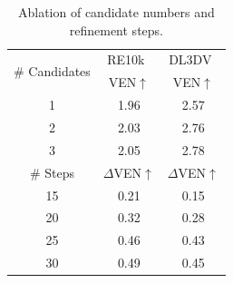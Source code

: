 \begin{table}[t]
\small
  \centering
  \begin{tabular}{c | c | c}
    \toprule
    \multirow{2}{*}{\# Candidates} & RE10k~\cite{re10k} & DL3DV~\cite{dl3dv} \\
    & VEN$\uparrow$ & VEN$\uparrow$  \\
    \midrule
    1 & 1.96 & 2.57  \\
    2 &  2.03 & 2.76  \\
    3 &  2.05 & 2.78  \\
    \midrule
     \# Steps & $\Delta$VEN$\uparrow$ & $\Delta$VEN$\uparrow$ \\
    \midrule
    15 & 0.21 & 0.15 \\
    20 & 0.32 & 0.28 \\
    25 & 0.46 & 0.43 \\
    30 & 0.49 & 0.45 \\
    \bottomrule
  \end{tabular}
  \caption{Ablation of candidate numbers and refinement steps.}
  \label{tab:ablate_search}
\end{table}